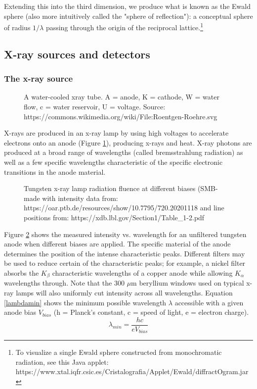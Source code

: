 Extending this into the third dimension, we produce what is known as the Ewald sphere (also more intuitively called the "sphere of reflection"): a conceptual sphere of radius $1/\lambda$ passing through the origin of the reciprocal lattice.\footnote{To visualize a single Ewald sphere constructed from monochromatic radiation, see this Java applet: https://www.xtal.iqfr.csic.es/Cristalografia/Applet/Ewald/diffractOgram.jar}

\subsection{X-ray sources and detectors}
\subsubsection{The x-ray source}
\begin{figure}[htbp]
  \centering
  
  \caption{A water-cooled xray tube. A = anode, K = cathode, W = water flow, c = water reservoir, U = voltage. Source: https://commons.wikimedia.org/wiki/File:Roentgen-Roehre.svg}
  \label{xraysource}
\end{figure}
X-rays are produced in an x-ray lamp by using high voltages to accelerate electrons onto an anode (Figure \ref{xraysource}), producing x-rays and heat. X-ray photons are produced at a broad range of wavelengths (called bremsstrahlung radiation) as well as a few specific wavelengths characteristic of the specific electronic transitions in the anode material.

\begin{figure}[htbp]
  \centering
  
  \caption{Tungsten x-ray lamp radiation fluence at different biases (SMB-made with intensity data from: https://oar.ptb.de/resources/show/10.7795/720.20201118 and line positions from: https://xdb.lbl.gov/Section1/Table_1-2.pdf}
  \label{Wradiation}
\end{figure}
Figure \ref{Wradiation} shows the measured intensity vs. wavelength for an unfiltered tungsten anode when different biases are applied. The specific material of the anode determines the position of the intense characteristic peaks. Different filters may be used to reduce certain of the characteristic peaks; for example, a nickel filter absorbs the $K_\beta$ characteristic wavelengths of a copper anode while allowing $K_\alpha$ wavelengths through. Note that the 300 $\mu$m beryllium windows used on typical x-ray lamps will also uniformly cut intensity across all wavelengths. Equation \ref{lambdamin} shows the minimum possible wavelength $\lambda$ accessible with a given anode bias $V_{bias}$ (h = Planck’s constant, c = speed of light, e = electron charge). 
\begin{equation}
    \lambda_{min} = \frac{hc}{eV_{bias} }
    \label{lambdamin}
\end{equation}

